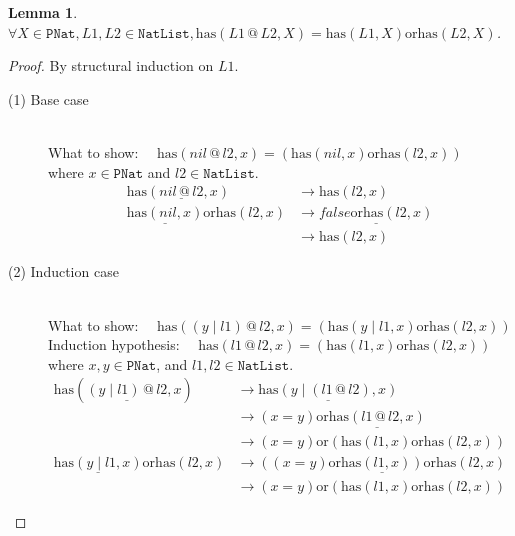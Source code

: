\documentclass[12pt, a4paper]{article}
\newtheorem{lemma}[theorem]{Lemma}
\newcommand{\rel}[1]{\mathrel{#1}}
\newcommand{\rmx}[1]{\mathrm{#1}}
\newcommand{\larrow}{\longrightarrow}
\newcommand{\under}{\underline}
\begin{document}
\begin{lemma}
\label{lm1}
$\forall X \in \mathtt{PNat}, L1, L2 \in \mathtt{NatList}, \rmx{has}(L1 \rel{@} L2, X) = \rmx{has}(L1, X) \rel{\rmx{or}} \rmx{has}(L2, X)$.
\end{lemma}
\begin{proof}
By structural induction on $L1$.

\begin{description}

\item[(1) Base case]~\\
\noindent
What to show: $\quad \rmx{has}(nil \rel{@} l2, x) = (\rmx{has}(nil, x) \rel{\rmx{or}} \rmx{has}(l2, x))$ \\
where $x \in \mathtt{PNat}$ and $l2 \in \mathtt{NatList}$.
\begin{align*}
\rmx{has}(\under{nil \rel{@} l2}, x)
	&\larrow \rmx{has}(l2, x) \tag{by @1} \\
\under{\rmx{has}(nil, x)} \rel{\rmx{or}} \rmx{has}(l2, x)
	&\larrow \under{false \rel{\rmx{or}} \rmx{has}(l2, x)} \tag{by has1} \\
	&\larrow \rmx{has}(l2, x) \tag{by or}
\end{align*}

\item[(2) Induction case]~\\
What to show: $\quad \rmx{has}((y \rel{|} l1) \rel{@} l2, x) = (\rmx{has}(y \rel{|} l1, x) \rel{\rmx{or}} \rmx{has}(l2, x))$ \\
Induction hypothesis: $\quad \rmx{has}(l1 \rel{@} l2, x) = (\rmx{has}(l1, x) \rel{\rmx{or}} \rmx{has}(l2, x))$  \\
where $x, y \in \mathtt{PNat}$, and $l1, l2 \in \mathtt{NatList}$.
\begin{align*}
\rmx{has}(\under{(y \rel{|} l1) \rel{@} l2}, x)
	&\larrow \under{\rmx{has}(y \rel{|} (l1 \rel{@} l2), x)} \tag{by @2} \\
	&\larrow (x = y) \rel{\rmx{or}} \under{\rmx{has}(l1 \rel{@} l2, x)} \tag{by has2} \\
	&\larrow (x = y) \rel{\rmx{or}} (\rmx{has}(l1, x) \rel{\rmx{or}} \rmx{has}(l2, x)) \tag{by IH} \\
\under{\rmx{has}(y \rel{|} l1, x)} \rel{\rmx{or}} \rmx{has}(l2, x)
	&\larrow \under{((x = y) \rel{\rmx{or}} \rmx{has}(l1, x)) \rel{\rmx{or}} \rmx{has}(l2, x)} \tag{by has2} \\
	&\larrow (x = y) \rel{\rmx{or}} (\rmx{has}(l1, x) \rel{\rmx{or}} \rmx{has}(l2, x)) \tag{by assoc-or}
\end{align*}

\end{description}
\end{proof}
\end{document}

